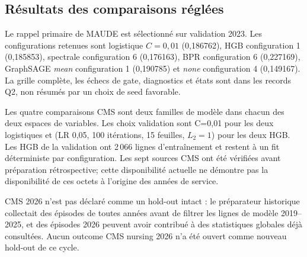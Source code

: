 \subsection{Résultats des comparaisons réglées}

\begin{table}[!htbp]\centering\small
\caption{Nouvelle comparaison MAUDE Q2 : rappel micro@10 en validation 2023 et tests annuels 2024--2025. Les modèles latents rapportent la moyenne des seeds 103/211/307, jamais le meilleur seed. Les résultats restent exploratoires.}
\label{tab:q2-maude}

\end{table}

Le rappel primaire de MAUDE est sélectionné sur validation 2023. Les configurations retenues sont logistique $C=0{,}01$ (0{,}186762), HGB configuration 1 (0{,}185853), spectrale configuration 6 (0{,}176163), BPR configuration 6 (0{,}227169), GraphSAGE \emph{mean} configuration 1 (0{,}190785) et \emph{none} configuration 4 (0{,}149167). La grille complète, les échecs de gate, diagnostics et états sont dans les records Q2, non résumés par un choix de seed favorable.

\begin{table}[!htbp]\centering\small
\caption{Nouvelle comparaison CMS nursing Q2 : ROC-AUC de validation 2023 et tests 2024, 2025 et poolé. L'augmentation de propriété n'est pas uniformément positive selon l'année; aucun effet causal ou niveau de significativité n'est inféré.}
\label{tab:q2-cms}

\end{table}

Les quatre comparaisons CMS sont deux familles de modèle dans chacun des deux espaces de variables. Les choix validation sont C=0{,}01 pour les deux logistiques et (LR 0{,}05, 100 itérations, 15 feuilles, $L_2=1$) pour les deux HGB. Les HGB de la validation ont 2\,066 lignes d'entraînement et restent à un fit déterministe par configuration. Les sept sources CMS ont été vérifiées avant préparation rétrospective; cette disponibilité actuelle ne démontre pas la disponibilité de ces octets à l'origine des années de service.

CMS 2026 n'est pas déclaré comme un hold-out intact : le préparateur historique collectait des épisodes de toutes années avant de filtrer les lignes de modèle 2019--2025, et des épisodes 2026 peuvent avoir contribué à des statistiques globales déjà consultées. Aucun outcome CMS nursing 2026 n'a été ouvert comme nouveau hold-out de ce cycle\cite{hgbq2methods}.

